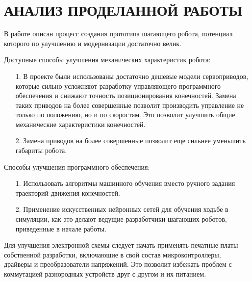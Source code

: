 \chapter{\MakeUppercase{Анализ проделанной работы}}

В работе описан процесс создания прототипа шагающего робота, потенциал которого по улучшению и модернизации достаточно велик.

Доступные способы улучшения механических характеристик робота:
\begin{itemize}
    \item[1.] В проекте были использованы достаточно дешевые модели сервоприводов, которые сильно усложняют разработку управляющего программного обеспечения и снижают точность позиционирования конечностей. Замена таких приводов на более совершенные позволит производить управление не только по положению, но и по скоростям. Это позволит улучшить общие механические характеристики конечностей.
    \item[2.] Замена приводов на более совершенные позволит еще сильнее уменьшить габариты робота. 
\end{itemize}

Способы улучшения программного обеспечения:
\begin{itemize}
    \item[1.] Использовать алгоритмы машинного обучения вместо ручного задания траекторий движения конечностей.
    \item[2.] Применение искусственных нейронных сетей для обучения ходьбе в симуляции, как это делают ведущие разработчики шагающих роботов, приведенные в начале работы. 
\end{itemize}

Для улучшения электронной схемы следует начать применять печатные платы собственной разработки, включающие в свой состав микроконтроллеры, драйверы и преобразователи напряжений. Это позволит избежать проблем с коммутацией разнородных устройств друг с другом и их питанием.